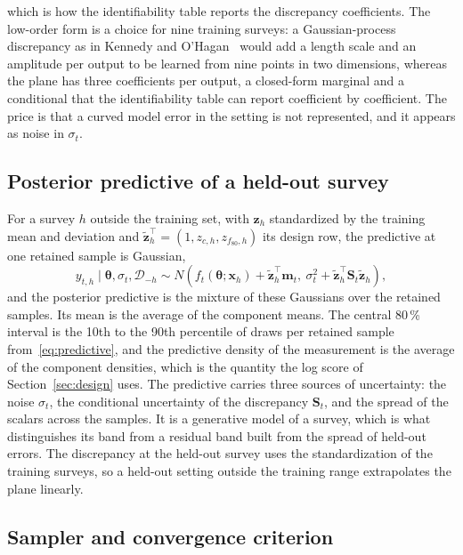 \documentclass[journal]{IEEEtran}
\newcommand{\pct}{\,\%}
\begin{document}
which is how the identifiability table reports the discrepancy coefficients. The low-order form is a choice for nine
training surveys: a Gaussian-process discrepancy as in Kennedy and O'Hagan~\cite{ko} would add a length scale and an
amplitude per output to be learned from nine points in two dimensions, whereas the plane has three coefficients per output,
a closed-form marginal and a conditional that the identifiability table can report coefficient by coefficient. The price is
that a curved model error in the setting is not represented, and it appears as noise in $\sigma_t$.

\subsection{Posterior predictive of a held-out survey}

For a survey $h$ outside the training set, with $\mathbf z_h$ standardized by the training mean and deviation and
$\tilde{\mathbf z}_h^{\top}=(1,z_{c,h},z_{f_{80},h})$ its design row, the predictive at one retained sample is Gaussian,
\begin{equation}
y_{t,h}\mid\boldsymbol\theta,\sigma_t,\mathcal D_{-h}\sim N\!\left(f_t(\boldsymbol\theta;\mathbf x_h)+\tilde{\mathbf z}_h^{\top}\mathbf m_t,\
\sigma_t^2+\tilde{\mathbf z}_h^{\top}\mathbf S_t\tilde{\mathbf z}_h\right),
\label{eq:predictive}
\end{equation}
and the posterior predictive is the mixture of these Gaussians over the retained samples. Its mean is the average of the
component means. The central 80\pct{} interval is the 10th to the 90th percentile of \draws{} draws per retained sample
from~\eqref{eq:predictive}, and the predictive density of the measurement is the average of the component densities,
which is the quantity the log score of Section~\ref{sec:design} uses. The predictive carries three sources of uncertainty:
the noise $\sigma_t$, the conditional uncertainty of the discrepancy $\mathbf S_t$, and the spread of the scalars across
the samples. It is a generative model of a survey, which is what distinguishes its band from a residual band built
from the spread of held-out errors. The discrepancy at the held-out survey uses the standardization of the training
surveys, so a held-out setting outside the training range extrapolates the plane linearly.

\subsection{Sampler and convergence criterion}
\end{document}

